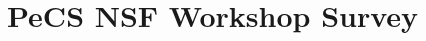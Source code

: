 

\def\thetitle{PeCS NSF Workshop Survey}
\def\shorttitle{PeCS NSF Workshop Survey}
\def\theauthors{Geoffrey Challen}
\def\shortauthors{Challen}


\pagestyle{document}
\thispagestyle{emptydocument}
\chapter{\thetitle}


